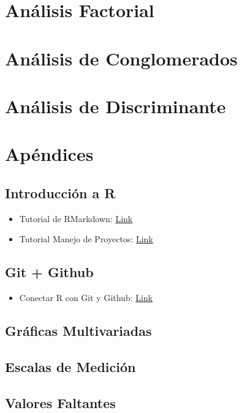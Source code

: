 \documentclass[
]{book}
\providecommand{\tightlist}{%
  \setlength{\itemsep}{0pt}\setlength{\parskip}{0pt}}
\begin{document}
\chapter{Análisis Factorial}\label{anuxe1lisis-factorial}

\chapter{Análisis de Conglomerados}\label{anuxe1lisis-de-conglomerados}

\chapter{Análisis de Discriminante}\label{anuxe1lisis-de-discriminante}

\chapter{Apéndices}\label{apuxe9ndices}

\section{Introducción a R}\label{introducciuxf3n-a-r}

\begin{itemize}
\item
  Tutorial de RMarkdown: \href{https://github.com/HaydeePeruyero/Rmarkdown_and_LaTeX/blob/main/ejemplo.Rmd}{Link}
\item
  Tutorial Manejo de Proyectos: \href{https://haydeeperuyero.github.io/Seminario_Estadistica/manejo-de-proyectos.html}{Link}
\end{itemize}

\section{Git + Github}\label{git-github}

\begin{itemize}
\tightlist
\item
  Conectar R con Git y Github: \href{https://r-ladies-morelia.github.io/blog/conectar/}{Link}
\end{itemize}

\section{Gráficas Multivariadas}\label{gruxe1ficas-multivariadas}

\section{Escalas de Medición}\label{escalas-de-mediciuxf3n}

\section{Valores Faltantes}\label{valores-faltantes}

  
\end{document}
